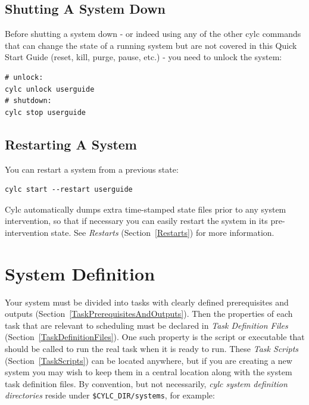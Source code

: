 \documentclass[11pt,a4paper]{article}
\begin{document}
\lstset{language=bash}
\subsection{Shutting A System Down}
\label{QuickShuttingASystemDown}

\lstset{language=bash}

Before shutting a system down - or indeed using any of the other cylc
commands that can change the state of a running system but are not 
covered in this Quick Start Guide (reset, kill, purge, pause, etc.) -
you need to unlock the system:

\begin{lstlisting}
# unlock:
cylc unlock userguide
# shutdown:
cylc stop userguide
\end{lstlisting}

\subsection{Restarting A System}
\label{QuickRestartingASystem}

You can restart a system from a previous state:

\begin{lstlisting}
cylc start --restart userguide
\end{lstlisting}

Cylc automatically dumps extra time-stamped state files prior to any
system intervention, so that if necessary you can easily restart the
system in its pre-intervention state.  See {\em Restarts}
(Section~\ref{Restarts}) for more information.


\pagebreak
\section{System Definition} 
\label{SystemDefinition}


Your system must be divided into tasks with clearly defined
prerequisites and outputs (Section~\ref{TaskPrerequisitesAndOutputs}). Then
the properties of each task that are relevant to scheduling must be
declared in {\em Task Definition Files}
(Section~\ref{TaskDefinitionFiles}). One such property is the script or
executable that should be called to run the real task when
it is ready to run. These {\em Task Scripts} (Section~\ref{TaskScripts})
can be located anywhere, but if you are creating a new system you may
wish to keep them in a central location along with the system task
definition files.  By convention, but not necessarily, {\em cylc system
definition directories} reside under \lstinline=$CYLC_DIR/systems=, for
example:
\end{document}
